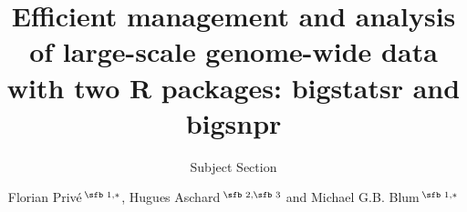 \documentclass{bioinfo}
\begin{document}

\subtitle{Subject Section}

\title[R packages for analyzing genome-wide data]{Efficient management and analysis of large-scale genome-wide data with two R packages: bigstatsr and bigsnpr}
\author[Sample \textit{et~al}.]{Florian Priv\'e\,$^{\text{\sfb 1,}*}$, Hugues Aschard\,$^{\text{\sfb 2,\sfb 3}}$ and Michael G.B. Blum\,$^{\text{\sfb 1,}*}$}
\address{$^{\text{\sf 1}}$Universit\'e Grenoble Alpes, CNRS, Laboratoire TIMC-IMAG, UMR 5525, France, \\
$^{\text{\sf 2}}$Centre de Bioinformatique, Biostatistique et Biologie Int\'egrative (C3BI), Institut Pasteur, Paris, France and \\
$^{\text{\sf 3}}$Department of Epidemiology, Harvard T.H. Chan School of Public Health, Boston, Massachusetts, USA.}



\end{document}
